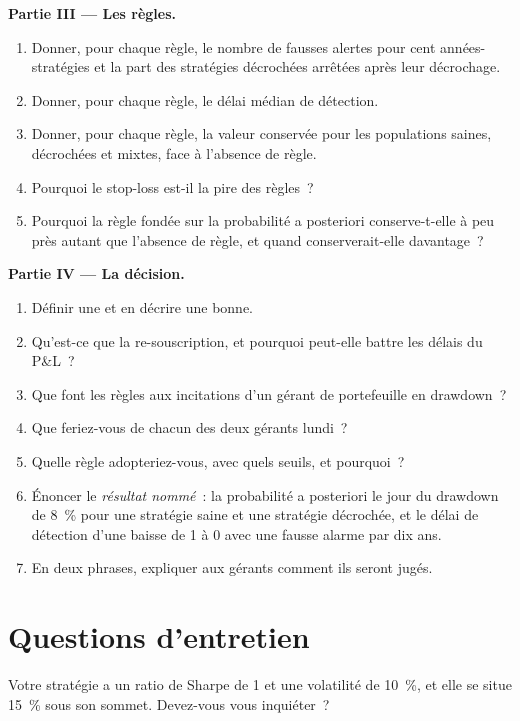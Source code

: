 \begin{problem}
\medskip\noindent\textbf{Partie III --- Les règles.}
\begin{enumerate}[resume]
\item Donner, pour chaque règle, le nombre de fausses alertes pour cent années-stratégies et la part des stratégies décrochées arrêtées après leur décrochage.
\item Donner, pour chaque règle, le délai médian de détection.
\item Donner, pour chaque règle, la valeur conservée pour les populations saines, décrochées et mixtes, face à l'absence de règle.
\item Pourquoi le stop-loss est-il la pire des règles~?
\item Pourquoi la règle fondée sur la probabilité a posteriori conserve-t-elle à peu près autant que l'absence de règle, et quand conserverait-elle davantage~?
\end{enumerate}

\medskip\noindent\textbf{Partie IV --- La décision.}
\begin{enumerate}[resume]
\item Définir une  et en décrire une bonne.
\item Qu'est-ce que la re-souscription, et pourquoi peut-elle battre les délais du P\&L~?
\item Que font les règles aux incitations d'un gérant de portefeuille en drawdown~?
\item Que feriez-vous de chacun des deux gérants lundi~?
\item Quelle règle adopteriez-vous, avec quels seuils, et pourquoi~?
\item Énoncer le \emph{résultat nommé}~: la probabilité a posteriori le jour du drawdown de 8~\% pour une stratégie saine et une stratégie décrochée, et le délai de détection
d'une baisse de 1 à 0 avec une fausse alarme par dix ans.
\item En deux phrases, expliquer aux gérants comment ils seront jugés.
\end{enumerate}
\end{problem}

\section{Questions d'entretien}

\begin{interviewq}\label{iq:fm:managing-a-book-through-drawdown:1}
Votre stratégie a un ratio de Sharpe de 1 et une volatilité de 10~\%, et elle se situe 15~\% sous son sommet. Devez-vous vous inquiéter~?
\end{interviewq}

